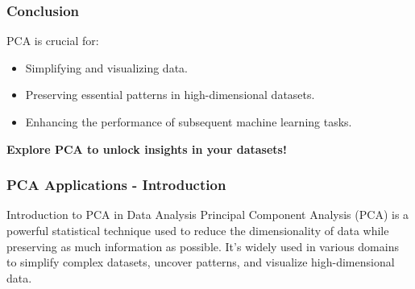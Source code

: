\documentclass[aspectratio=169]{beamer}
\begin{document}
\begin{frame}
    \frametitle{Conclusion}
    PCA is crucial for:
    \begin{itemize}
        \item Simplifying and visualizing data.
        \item Preserving essential patterns in high-dimensional datasets.
        \item Enhancing the performance of subsequent machine learning tasks.
    \end{itemize}
    \textbf{Explore PCA to unlock insights in your datasets!}
\end{frame}

\begin{frame}[fragile]
    \frametitle{PCA Applications - Introduction}
    \begin{block}{Introduction to PCA in Data Analysis}
        Principal Component Analysis (PCA) is a powerful statistical technique used to reduce the dimensionality of data while preserving as much information as possible. 
        It's widely used in various domains to simplify complex datasets, uncover patterns, and visualize high-dimensional data.
    \end{block}
\end{frame}
\end{document}
